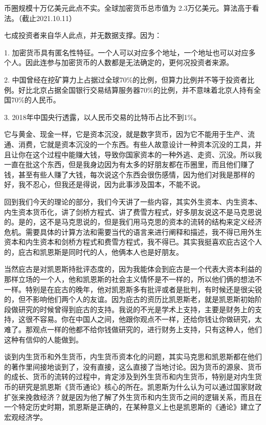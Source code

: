 \documentclass[UTF8, 12pt, a4paper]{ctexrep}
\begin{document}
币圈规模十万亿美元此点不实。全球加密货币总市值为 2.3万亿美元。算法高于看法。（截止2021.10.11）

{\kaishu 七成投资者来自华人此点，并无数据支撑。因为：

1. 加密货币具有匿名性特征。一个人可以对应多个地址，一个地址也可以对应多个人。因此连参与加密货币的人数都是无法确定的，更何况投资者来源。

2. 中国曾经在挖矿算力上占据过全球70\%的比例，但算力比例并不等于投资者比例。好比北京占据全国银行交易结算服务器70\%的比例，并不意味着北京人持有全国70\%的人民币。

3. 2018年中国央行透露，以人民币交易的比特币占比不到1\%。}

它与黄金、现金一样，它是资本沉没，就是数字货币，因为它不能用于生产、流通、消费，它就是资本沉没的一个东西。有些人故意设计一种资本沉没的工具，并且让你在这个过程中能赚大钱，导致你国家资本的一种外逃、走资、沉没。所以我一直在批这个东西，但是我身边因为有太多的好朋友都在币圈里，而且他们赚了钱，甚至有些人赚了大钱，每次说这个东西会很伤感情，因为他们对我是那样的好，我不忍心，但我还是得说，因为此事涉及国本，不能不说。

回到我们今天的理论的部分，我们今天讲了一些内容，其实外生资本、内生资本、内生资本货币化，讲了剑桥方程式、讲了费雪方程式，好多朋友说这不是马克思说的。是的，这不是马克思说的，但是我们用马克思的资本的流转的结构来定义经济危机。需要具体的计算方法和需要当代的语言来进行阐释和描述，我不得已用外生资本和内生资本和剑桥方程式和费雪方程式，我不得已。其实我挺喜欢庇古这个人的，庇古和凯恩斯是同时代的人，他俩本人也是好朋友。

当然庇古是对凯恩斯持批评态度的，因为我能体会到庇古是一个代表大资本利益的那样立场的一个人，他和凯恩斯的社会主义情怀是不一样的，所以他们俩的想法不一样。特别是在庇古的晚年，他对凯恩斯多有批评或者是批判，有时候还是很尖锐的，但不影响他们两个人的友谊。因为庇古的资历比凯恩斯老，就是凯恩斯初始阶段做研究的时候曾得到庇古的支持。我说的不光是学术上支持，主要是财务上的支持，这很不容易。你在中国人之间，他跟你观点不一样，还给你钱让你做研究，太难了。那观点一样的他都不给你钱做研究的，进行财务上支持，只有这种人，他们这种有信仰的人能做到。

谈到内生货币和外生货币，内生货币资本化的问题，其实马克思和凯恩斯都在他们的著作里间接地谈到了，没有直接，这么直接了当地讨论。因为货币的源泉、货币的成长、货币的流转的过程中，肯定涉及到外生货币和内生货币，特别是对内生货币的研究是凯恩斯《货币通论》核心的所在。凯恩斯为什么认为可以通过国家财政扩张来挽救经济？就是因为他了解了外生货币和内生货币之间的逻辑关系，而且在一个特定历史时期，凯恩斯是正确的，在某种意义上也是凯恩斯的《通论》建立了宏观经济学。
\end{document}
